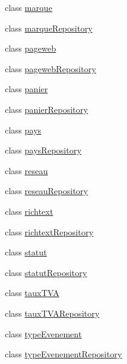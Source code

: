\begin{DoxyCompactItemize}
\item 
class \hyperlink{class_acme_group_1_1_labo_bundle_1_1_entity_1_1marque}{marque}
\item 
class \hyperlink{class_acme_group_1_1_labo_bundle_1_1_entity_1_1marque_repository}{marque\+Repository}
\item 
class \hyperlink{class_acme_group_1_1_labo_bundle_1_1_entity_1_1pageweb}{pageweb}
\item 
class \hyperlink{class_acme_group_1_1_labo_bundle_1_1_entity_1_1pageweb_repository}{pageweb\+Repository}
\item 
class \hyperlink{class_acme_group_1_1_labo_bundle_1_1_entity_1_1panier}{panier}
\item 
class \hyperlink{class_acme_group_1_1_labo_bundle_1_1_entity_1_1panier_repository}{panier\+Repository}
\item 
class \hyperlink{class_acme_group_1_1_labo_bundle_1_1_entity_1_1pays}{pays}
\item 
class \hyperlink{class_acme_group_1_1_labo_bundle_1_1_entity_1_1pays_repository}{pays\+Repository}
\item 
class \hyperlink{class_acme_group_1_1_labo_bundle_1_1_entity_1_1reseau}{reseau}
\item 
class \hyperlink{class_acme_group_1_1_labo_bundle_1_1_entity_1_1reseau_repository}{reseau\+Repository}
\item 
class \hyperlink{class_acme_group_1_1_labo_bundle_1_1_entity_1_1richtext}{richtext}
\item 
class \hyperlink{class_acme_group_1_1_labo_bundle_1_1_entity_1_1richtext_repository}{richtext\+Repository}
\item 
class \hyperlink{class_acme_group_1_1_labo_bundle_1_1_entity_1_1statut}{statut}
\item 
class \hyperlink{class_acme_group_1_1_labo_bundle_1_1_entity_1_1statut_repository}{statut\+Repository}
\item 
class \hyperlink{class_acme_group_1_1_labo_bundle_1_1_entity_1_1taux_t_v_a}{taux\+T\+V\+A}
\item 
class \hyperlink{class_acme_group_1_1_labo_bundle_1_1_entity_1_1taux_t_v_a_repository}{taux\+T\+V\+A\+Repository}
\item 
class \hyperlink{class_acme_group_1_1_labo_bundle_1_1_entity_1_1type_evenement}{type\+Evenement}
\item 
class \hyperlink{class_acme_group_1_1_labo_bundle_1_1_entity_1_1type_evenement_repository}{type\+Evenement\+Repository}
\item 

\end{DoxyCompactItemize}
